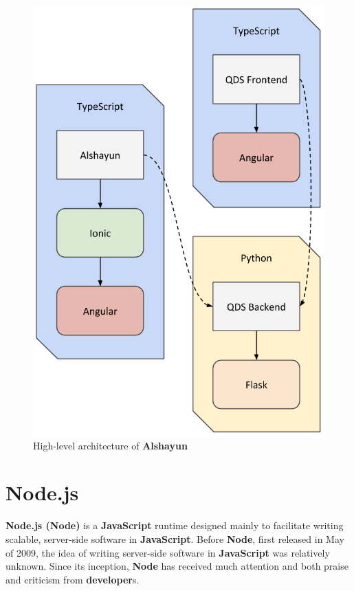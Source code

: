 \documentclass[12pt]{report}
\begin{document}
\begin{figure}
    \centering
    \includegraphics[scale=0.5]{images/arch.png}
    \caption{High-level architecture of \textbf{Alshayun}}
    \label{fig:arch}
\end{figure}

    \section{Node.js}

\textbf{Node\@.js (Node)} \cite{nodejs} is a \textbf{JavaScript} runtime
designed mainly to facilitate writing scalable, server-side software in
\textbf{JavaScript}. Before \textbf{Node}, first released in May of 2009, the
idea of writing server-side software in \textbf{JavaScript} was relatively
unknown. Since its inception, \textbf{Node} has received much attention and both
praise and criticism from \textbf{developer}s.
\end{document}
